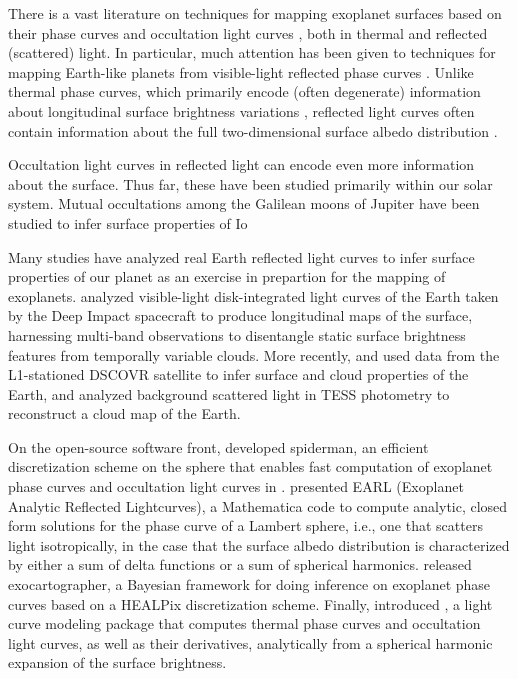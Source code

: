 \documentclass[modern]{aastex62}
\begin{document}
There is a vast literature on techniques for mapping exoplanet surfaces
based on their phase curves
\citep[e.g.,][]{Russell1906,Lacis1972,Knutson2007,Cowan2008,Oakley2009,Berdyugina2017}
and occultation light curves
\citep[e.g.,][]{Williams2006,Rauscher2007,Majeau2012,deWit2012,Rauscher2018},
both in thermal and reflected (scattered) light.
In particular, much attention has been given to techniques for mapping
Earth-like planets from visible-light reflected phase curves
\citep[e.g.,][]{Ford2001,Kawahara2010,Kawahara2011,Fujii2012,Kawahara2020,Aizawa2020}.
Unlike thermal phase curves, which primarily encode (often degenerate)
information about longitudinal surface brightness variations
\citep{Russell1906}, reflected light curves often contain information
about the full two-dimensional surface albedo distribution
\citep[e.g.,][]{Kawahara2010}.

Occultation light curves in reflected light can encode even more information
about the surface. Thus far, these have been studied primarily within our
solar system. Mutual occultations among the Galilean moons of Jupiter
have been studied to infer surface properties of Io 

Many studies have analyzed real Earth reflected light curves to
infer surface properties of our planet as an exercise in
prepartion for the mapping of exoplanets.
%
\citet{Cowan2009} analyzed visible-light disk-integrated light curves
of the Earth taken by the Deep Impact spacecraft to produce
longitudinal maps of the surface, harnessing multi-band observations
to disentangle static surface brightness features from temporally
variable clouds. More recently, \citet{Jiang2018} and \citet{Fan2019}
used data from the L1-stationed DSCOVR satellite to infer surface
and cloud properties of the Earth, and \citet{Luger2019b} analyzed
background scattered light in TESS photometry to reconstruct a cloud
map of the Earth.

On the open-source software front, \citet{Louden2018} developed
\textsf{spiderman}, an efficient discretization scheme
on the sphere that enables fast computation of exoplanet
phase curves and occultation light curves in \Python.
%
\citet{Haggard2018} presented
\textsf{EARL} (Exoplanet Analytic Reflected Lightcurves),
a \textsf{Mathematica} code to compute analytic, closed form
solutions for the phase curve of a Lambert sphere, i.e., one that
scatters light isotropically, in the case that the surface albedo
distribution is characterized by either a sum of delta functions
or a sum of spherical harmonics.
%
\citet{Farr2018} released \textsf{exocartographer}, a Bayesian
framework for doing inference on exoplanet phase curves based on
a HEALPix \citep{healpix} discretization scheme.
%
Finally, \citet{Luger2019} introduced \starry, a light curve
modeling package that computes thermal phase curves and occultation
light curves, as well as their derivatives, analytically from a spherical
harmonic expansion of the surface brightness.
\end{document}
